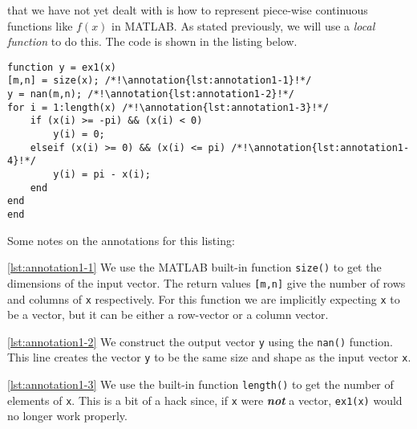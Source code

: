  that we have not yet dealt with is how to represent piece-wise continuous functions like $f(x)$ in MATLAB.  As stated previously, we will use a \emph{local function} to do this.  The code is shown in the listing below.

\begin{lstlisting}[name=lec17-ex1]
%% Local functions 
function y = ex1(x) 
[m,n] = size(x); /*!\annotation{lst:annotation1-1}!*/
y = nan(m,n); /*!\annotation{lst:annotation1-2}!*/
for i = 1:length(x) /*!\annotation{lst:annotation1-3}!*/
    if (x(i) >= -pi) && (x(i) < 0) 
        y(i) = 0;
    elseif (x(i) >= 0) && (x(i) <= pi) /*!\annotation{lst:annotation1-4}!*/
        y(i) = pi - x(i);
    end
end
end
\end{lstlisting} \setcounter{lstannotation}{0}
Some notes on the annotations for this listing:

\vspace{0.25cm}

\noindent \ref{lst:annotation1-1}  We use the MATLAB built-in function \lstinline{size()} to get the dimensions of the input vector.  The return values \lstinline{[m,n]} give the number of rows and columns of \lstinline{x} respectively. For this function we are implicitly expecting \lstinline{x} to be a vector, but it can be either a row-vector or a column vector.

\vspace{0.25cm}

\noindent \ref{lst:annotation1-2} We construct the output vector \lstinline{y} using the \lstinline{nan()} function.  This line creates the vector \lstinline{y} to be the same size and shape as the input vector \lstinline{x}.  


\vspace{0.25cm}

\noindent \ref{lst:annotation1-3} We use the built-in function \lstinline{length()} to get the number of elements of \lstinline{x}.  This is a bit of a hack since, if \lstinline{x} were \textbf{\emph{not}} a vector, \lstinline{ex1(x)} would no longer work properly.

